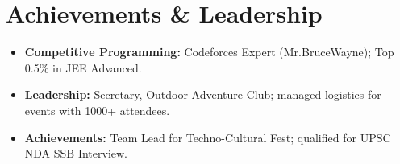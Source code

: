 \documentclass[a4paper,11pt]{article}
\newcommand{\resumeItem}[1]{
  \item\small{
    {#1 \vspace{-1.5pt}}
  }
}
\begin{document}
\section{Achievements \& Leadership}




\begin{itemize}[leftmargin=0.15in, labelsep=5pt, itemsep=3pt, parsep=0pt]
    \resumeItem{\textbf{Competitive Programming:} Codeforces Expert (Mr.BruceWayne); Top 0.5\% in JEE Advanced.}
    \resumeItem{\textbf{Leadership:} Secretary, Outdoor Adventure Club; managed logistics for events with 1000+ attendees.}
    \resumeItem{\textbf{Achievements:} Team Lead for Techno-Cultural Fest; qualified for UPSC NDA SSB Interview.}
\end{itemize}
\end{document}
